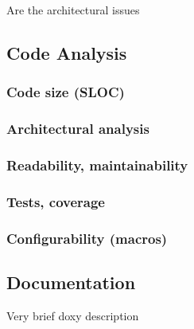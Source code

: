 Are the architectural issues

\subsection{Code Analysis}
\subsubsection{Code size (SLOC)}
\subsubsection{Architectural analysis}
\subsubsection{Readability, maintainability}
\subsubsection{Tests, coverage}
\subsubsection{Configurability (macros)}

\subsection{Documentation}

Very brief doxy description





